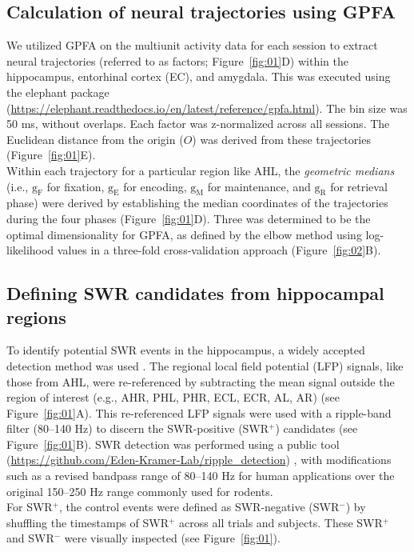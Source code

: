 \documentclass[final,3p,times,twocolumn]{elsarticle}
\begin{document}
\subsection{Calculation of neural trajectories using GPFA}
We utilized GPFA \cite{yu_gaussian-process_2009} on the multiunit activity data for each session to extract neural trajectories (referred to as factors; Figure~\ref{fig:01}D) within the hippocampus, entorhinal cortex (EC), and amygdala. This was executed using the elephant package (\url{https://elephant.readthedocs.io/en/latest/reference/gpfa.html}). The bin size was 50 ms, without overlaps. Each factor was z-normalized across all sessions. The Euclidean distance from the origin ($O$) was derived from these trajectories (Figure~\ref{fig:01}E).
\\
\indent
Within each trajectory for a particular region like AHL, the \textit{geometric medians} (i.e., $\mathrm{g_{F}}$ for fixation, $\mathrm{g_{E}}$ for encoding, $\mathrm{g_{M}}$ for maintenance, and $\mathrm{g_{R}}$ for retrieval phase) were derived by establishing the median coordinates of the trajectories during the four phases (Figure~\ref{fig:01}D). Three was determined to be the optimal dimensionality for GPFA, as defined by the elbow method using log-likelihood values in a three-fold cross-validation approach (Figure~\ref{fig:02}B).

\subsection{Defining SWR candidates from hippocampal regions}
To identify potential SWR events in the hippocampus, a widely accepted detection method was used \cite{liu_consensus_2022}. The regional local field potential (LFP) signals, like those from AHL, were re-referenced by subtracting the mean signal outside the region of interest (e.g., AHR, PHL, PHR, ECL, ECR, AL, AR) (see Figure~\ref{fig:01}A). This re-referenced LFP signals were used with a ripple-band filter (80--140 Hz) to discern the SWR-positive (SWR$^+$) candidates (see Figure~\ref{fig:01}B). SWR detection was performed using a public tool (\url{https://github.com/Eden-Kramer-Lab/ripple_detection}) \cite{kay_hippocampal_2016}, with modifications such as a revised bandpass range of 80--140 Hz for human applications \cite{norman_hippocampal_2019,norman_hippocampal_2021} over the original 150--250 Hz range commonly used for rodents.
\\
\indent
For SWR$^+$, the control events were defined as SWR-negative (SWR$^-$) by shuffling the timestamps of SWR$^+$ across all trials and subjects. These SWR$^+$ and SWR$^-$  were visually inspected (see Figure~\ref{fig:01}).
\end{document}
